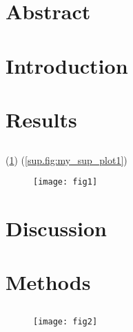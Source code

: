 \documentclass{article}
\begin{document}
\maketitle

{
	\section*{Abstract}
	\lipsum[1]
}%

\newpage
\section*{Introduction}
\lipsum[2][1-4]
\cite{koch2015siamese}
\lipsum[2][5-100]

\newpage
\section*{Results}\label{results}
\subsection*{\lipsum[10][1]}

\lipsum[3][1-4]
\cite{pearson1901liii}
\lipsum[3][5]
(\ref{fig:my_plot1})
\lipsum[3][6]
(\ref{sup.fig:my_sup_plot1})
\lipsum[3][7-100]

\begin{figure}[h]
	\begin{center}
		\texttt{[image: fig1]}
	\end{center}
	\caption{}
	\label{fig:my_plot1}
\end{figure}

\newpage
\section*{Discussion}
\lipsum[4]

\newpage
\section*{Methods}
\subsection*{\lipsum[10][2]}
\lipsum[15]

\begin{figure}[h]
	\begin{center}
		\texttt{[image: fig2]}
	\end{center}
	\caption{}
	\label{fig:my_plot2}
\end{figure}
\end{document}
